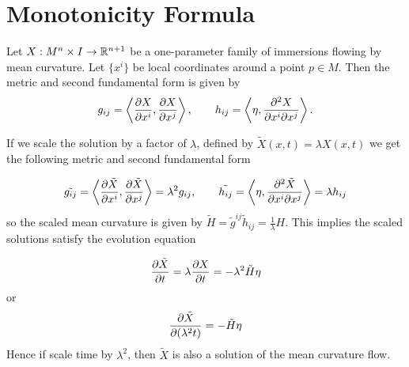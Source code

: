 \begin{comment}
Combining the two lemmas, we get 
\begin{equation}
\rho_{+} \le \frac{n+2}{\sqrt{n+1}}C\rho_{-} \label{pinching}
\end{equation}

Let $ \{\mathcal{M}_{t}\}_{t \in [0,T)}$ be family of hypersurfaces flowing under MCF with maximal time $ T $ and the initial pinching constant given by
\[ C = \sup_{ \mathcal{M}_{0}} \frac{\kappa_{n}}{\kappa_{1}} \]

If we can show that $ \rho_{-} \to 0 $ as $ t \to T $, then inequality (\ref{pinching}) would imply $ \rho_{+} \to 0 $. This proves the convergence of hypersurfaces to a point. 
\begin{thm}
The inradius $ \rho_{t} $ of $ \Omega_{t} $ tends to zero as $ t \to T $. Thus, $ \mathcal{M}_{t} $ converges to some point $ p \in \Rn $ as $ t \to T $.
\end{thm}
\end{comment}

\section{Monotonicity Formula}
Let $ X: M^{n} \times I \to \mathbb{R}^{n+1} $ be a one-parameter family of immersions flowing by mean curvature. Let $ \{x^{i}\} $ be local coordinates around a point $ p \in M $. Then the metric and second fundamental form is given by 
\[ g_{ij} = \left< \frac{\partial X}{\partial x^{i}}, \frac{\partial X}{\partial x^{j}} \right> , \qquad h_{ij} = \left<\eta, \frac{\partial^{2}X}{\partial x^{i}\partial x^{j}} \right>. \]

If we scale the solution by a factor of $ \lambda  $, defined by $ \tilde{X}(x,t) = \lambda X(x,t) $ we get the following metric and second fundamental form 

\[ \tilde{g_{ij}} = \left< \frac{\partial \tilde{X}}{\partial x^{i}}, \frac{\partial \tilde{X}}{\partial x^{j}} \right>  = \lambda^{2}g_{ij} ,\qquad \tilde{h_{ij}} = \left<\eta, \frac{\partial^{2}\tilde{X}}{\partial x^{i}\partial x^{j}} \right>  = \lambda h_{ij}\]
so the scaled mean curvature is given by $ \tilde{H} = \tilde{g}^{{ij}}\tilde{h}_{ij} = \frac{1}{\lambda}H $. This implies the scaled solutions satisfy the evolution equation

\[ \frac{\partial \tilde{X}}{\partial t} = \lambda \frac{\partial X}{\partial t} = -\lambda^{2}\tilde{H}\eta \]
or
\[ \frac{\partial \tilde{X}}{\partial (\lambda^{2}t)} = - \tilde{H}\eta \]
Hence if scale time by $ \lambda^{2} $, then $ \tilde{X} $ is also a solution of the mean curvature flow.

